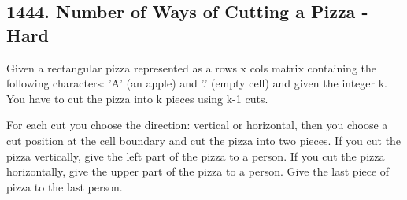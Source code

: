 \documentclass[9pt, b5paaper]{book}
\begin{document}
\subsection{1444. Number of Ways of Cutting a Pizza - Hard}
\label{sec-1-1-8}
Given a rectangular pizza represented as a rows x cols matrix containing the following characters: 'A' (an apple) and '.' (empty cell) and given the integer k. You have to cut the pizza into k pieces using k-1 cuts. 

For each cut you choose the direction: vertical or horizontal, then you choose a cut position at the cell boundary and cut the pizza into two pieces. If you cut the pizza vertically, give the left part of the pizza to a person. If you cut the pizza horizontally, give the upper part of the pizza to a person. Give the last piece of pizza to the last person.
\end{document}

